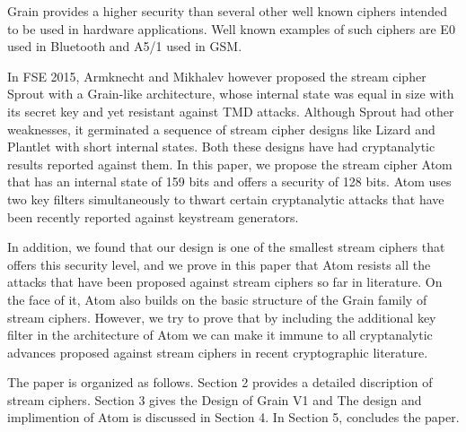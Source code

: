 Grain provides a higher security than several other well known ciphers intended to be used in
hardware applications. Well known examples of such ciphers are E0 used in Bluetooth and A5/1
used in GSM.

In FSE 2015, Armknecht and Mikhalev however proposed the stream cipher Sprout with a Grain-like architecture, whose internal state was equal in size with its secret key and yet resistant against TMD attacks. Although Sprout had other weaknesses, it germinated a sequence of stream cipher designs like Lizard and Plantlet with short internal states. Both these designs have had cryptanalytic results reported against them. In this paper, we propose the stream cipher Atom that has an internal state of 159 bits and offers a security of 128 bits. Atom uses two key filters simultaneously to thwart certain cryptanalytic attacks that have been recently reported against keystream generators.

In addition, we found that our design is one of the smallest stream ciphers that offers this security level, and we prove in this paper that Atom resists all the attacks that have been proposed against stream ciphers so far in literature. On the face of it, Atom also builds on the basic structure of the Grain family of stream ciphers. However, we try to prove that by including the additional key filter in the architecture of Atom we can make it immune to all cryptanalytic advances proposed against stream ciphers in recent cryptographic literature.

The paper is organized as follows. Section 2 provides a detailed discription of stream ciphers. Section 3 gives the Design of Grain V1 and The design and implimention of Atom is discussed in Section 4. In Section 5, concludes the paper.